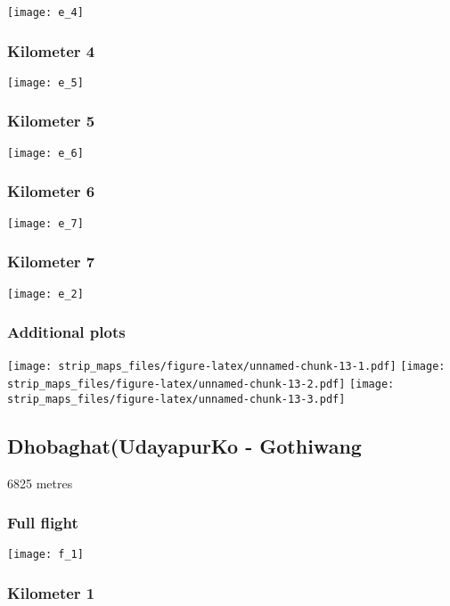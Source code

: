\documentclass[]{article}
\begin{document}
\texttt{[image: e\_4]}

\subsubsection{Kilometer 4}\label{kilometer-4-4}

\texttt{[image: e\_5]}

\subsubsection{Kilometer 5}\label{kilometer-5-4}

\texttt{[image: e\_6]}

\subsubsection{Kilometer 6}\label{kilometer-6-4}

\texttt{[image: e\_7]}

\subsubsection{Kilometer 7}\label{kilometer-7-3}

\texttt{[image: e\_2]}

\subsubsection{Additional plots}\label{additional-plots-4}

\texttt{[image: strip\_maps\_files/figure-latex/unnamed-chunk-13-1.pdf]}
\texttt{[image: strip\_maps\_files/figure-latex/unnamed-chunk-13-2.pdf]}
\texttt{[image: strip\_maps\_files/figure-latex/unnamed-chunk-13-3.pdf]}

\newpage

\subsection{Dhobaghat(UdayapurKo -
Gothiwang}\label{dhobaghatudayapurko---gothiwang}

6825 metres

\subsubsection{Full flight}\label{full-flight-5}

\texttt{[image: f\_1]}

\subsubsection{Kilometer 1}\label{kilometer-1-5}
\end{document}
